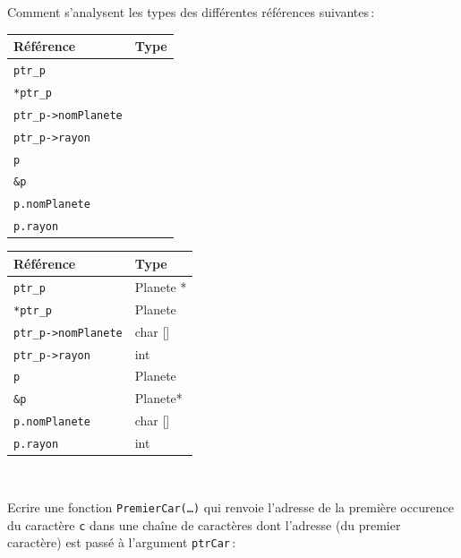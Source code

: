 \documentclass[10pt]{article}\usepackage[nu]{esial}
\begin{document}
\bigskip Comment s'analysent les types des différentes références
suivantes\,:

\bigskip

\begin{tabular}{|p{.2\linewidth}|p{.3\linewidth}|}
  \hline
  Référence  &             Type         \\\hline
  \verb+ptr_p+     &               \\\hline                  
  \verb+*ptr_p+         &         \\\hline            
  \verb+ptr_p->nomPlanete+& \\\hline
  \verb+ptr_p->rayon+& \\\hline
  \verb+p+& \\\hline
  \verb+&p+& \\\hline
  \verb+p.nomPlanete+& \\\hline
  \verb+p.rayon+& \\\hline
\end{tabular}


\begin{Reponse}

\begin{tabular}{|p{.2\linewidth}|p{.3\linewidth}|}
  \hline
  Référence  &             Type         \\\hline
  \verb+ptr_p+     &      Planete *         \\\hline                  
  \verb+*ptr_p+         &  Planete       \\\hline            
  \verb+ptr_p->nomPlanete+& char []\\\hline
  \verb+ptr_p->rayon+& int\\\hline
  \verb+p+& Planete\\\hline
  \verb+&p+& Planete*\\\hline
  \verb+p.nomPlanete+& char []\\\hline
  \verb+p.rayon+& int\\\hline
\end{tabular}
~
\end{Reponse}


 


\bigskip\bigskip{}

\Question
Ecrire une fonction {\tt PremierCar(\ldots)} qui renvoie l'adresse de
la première occurence du 
caractère {\tt c} dans une chaîne de caractères dont l'adresse (du
premier caractère) est passé à l'argument {\tt ptrCar}\,:
\end{document}

